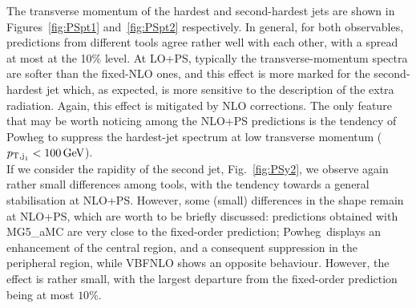The transverse momentum of the hardest and second-hardest jets are shown in Figures~\ref{fig:PSpt1} and~\ref{fig:PSpt2} respectively. In general, for both observables,
predictions from different tools agree rather well with each other, with a spread at most at the 10\% level. At LO+PS, typically the transverse-momentum spectra are softer than
the fixed-NLO ones, and this effect is more marked for the second-hardest jet which, as expected, is more sensitive to the description of the extra radiation. Again, this
effect is mitigated by NLO corrections. The only feature that may be worth noticing among the NLO+PS predictions is the tendency of {\sc Powheg} to suppress the
hardest-jet spectrum at low transverse momentum ($p_{\text{T},\text{j}_1}<100 \,\text{GeV}$).\\
If we consider the rapidity of the second jet, Fig.~\ref{fig:PSy2}, we observe again rather small differences among tools, with the tendency towards a general
stabilisation at NLO+PS. However, some (small) differences in the shape remain at NLO+PS, which are worth to be briefly discussed: predictions
obtained with {\sc MG5\_aMC} are very close to the fixed-order prediction; {\sc Powheg}\ displays an enhancement of the central region, and a consequent suppression in the
peripheral region, while {\sc VBFNLO} shows an opposite behaviour. However, the effect is rather small, with the largest departure from the fixed-order prediction being
at most $10\%$.



